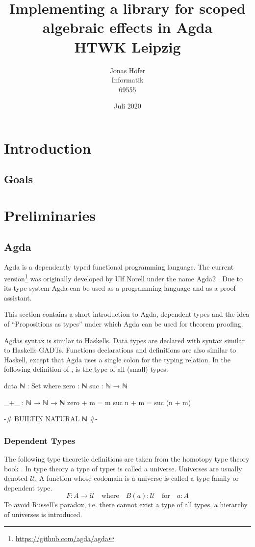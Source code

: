 \documentclass[10pt,a4paper,twoside]{report}
\title{
  {\huge\textbf{Implementing a library for scoped algebraic effects in Agda}}\\
  {\large HTWK Leipzig}
}
\author{
  {Jonas Höfer}\\
  {Informatik}\\
  {69555}
}
\date{Juli 2020}
\begin{document}
\maketitle
\begin{abstract}
\end{abstract}

\tableofcontents

\chapter{Introduction}
\section{Goals}

\chapter{Preliminaries}
\section{Agda}

Agda is a dependently typed functional programming language.
The current version\footnote{\url{https://github.com/agda/agda}} was originally
developed by Ulf Norell under the name Agda2 \cite{norell:thesis}.
Due to its type system Agda can be used as a programming language and as a proof
assistant.

This section contains a short introduction to Agda, dependent types and the idea
of ``Propositions as types'' under which Agda can be used for theorem proofing.

Agdas syntax is similar to Haskells.
Data types are declared with syntax similar to Haskells GADTs.
Functions declarations and definitions are also similar to Haskell, except that
Agda uses a single colon for the typing relation.
In the following definition of ,  is the type
of all (small) types.

\begin{code}
data ℕ : Set where
  zero  : ℕ
  suc   : ℕ → ℕ
 
_+_ : ℕ → ℕ → ℕ
zero   + m = m
suc n  + m = suc (n + m)
\end{code}
\begin{code}[hide]
{-# BUILTIN NATURAL ℕ #-}
\end{code}

\subsection{Dependent Types}
The following type theoretic definitions are taken from the homotopy type theory
book \cite{hottbook}.
In type theory a type of types is called a universe.
Universes are usually denoted $\mathcal{U}$.
A function whose codomain is a universe is called a type family or dependent
type.
$$
F : A \rightarrow \mathcal{U} \quad\text{where}\quad B(a) : \mathcal{U}
\quad\text{for}\quad a : A
$$
To avoid Russell's paradox, i.e. there cannot exist a type of all types, a
hierarchy of universes is introduced.
\end{document}
